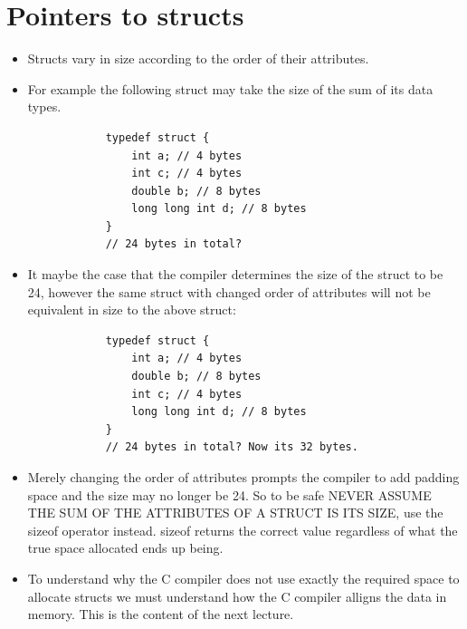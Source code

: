 \section{Pointers to structs}
\begin{itemize}
    \item Structs vary in size according to the order of their attributes.
    \item For example the following struct may take the size of the sum of its data types.
        \begin{verbatim}
            typedef struct {
                int a; // 4 bytes
                int c; // 4 bytes
                double b; // 8 bytes
                long long int d; // 8 bytes
            }
            // 24 bytes in total?
        \end{verbatim}
    
    \item It maybe the case that the compiler determines the size of the struct to be 24, however the same struct with changed order of attributes will not be equivalent in size to the above struct:
        \begin{verbatim}
            typedef struct {
                int a; // 4 bytes
                double b; // 8 bytes
                int c; // 4 bytes
                long long int d; // 8 bytes
            }
            // 24 bytes in total? Now its 32 bytes.
        \end{verbatim}
    
    \item Merely changing the order of attributes prompts the compiler to add padding space and the size may no longer be 24. So to be safe NEVER ASSUME THE SUM OF THE ATTRIBUTES OF A STRUCT IS ITS SIZE, use the sizeof operator instead. sizeof returns the correct value regardless of what the true space allocated ends up being.
    \item To understand why the C compiler does not use exactly the required space to allocate structs we must understand how the C compiler alligns the data in memory. This is the content of the next lecture.
\end{itemize}

